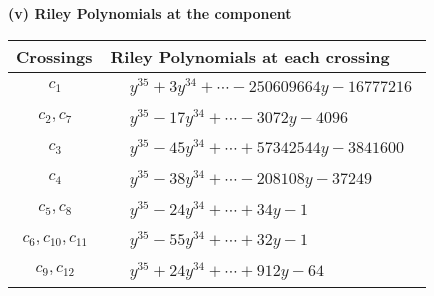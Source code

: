\documentclass[1p]{elsarticle_modified}
\theoremstyle{definition}
\begin{document}
\flushleft \textbf{(v) Riley Polynomials at the component}\newline \\
\begin{tabular}{m{50pt}|m{274pt}}
Crossings & \hspace{64pt}Riley Polynomials at each crossing \\
\hline $$\begin{aligned}c_{1}\end{aligned}$$&$\begin{aligned}
&y^{35}+3 y^{34}+\cdots-250609664 y-16777216
\end{aligned}$\\
\hline $$\begin{aligned}c_{2},c_{7}\end{aligned}$$&$\begin{aligned}
&y^{35}-17 y^{34}+\cdots-3072 y-4096
\end{aligned}$\\
\hline $$\begin{aligned}c_{3}\end{aligned}$$&$\begin{aligned}
&y^{35}-45 y^{34}+\cdots+57342544 y-3841600
\end{aligned}$\\
\hline $$\begin{aligned}c_{4}\end{aligned}$$&$\begin{aligned}
&y^{35}-38 y^{34}+\cdots-208108 y-37249
\end{aligned}$\\
\hline $$\begin{aligned}c_{5},c_{8}\end{aligned}$$&$\begin{aligned}
&y^{35}-24 y^{34}+\cdots+34 y-1
\end{aligned}$\\
\hline $$\begin{aligned}c_{6},c_{10},c_{11}\end{aligned}$$&$\begin{aligned}
&y^{35}-55 y^{34}+\cdots+32 y-1
\end{aligned}$\\
\hline $$\begin{aligned}c_{9},c_{12}\end{aligned}$$&$\begin{aligned}
&y^{35}+24 y^{34}+\cdots+912 y-64
\end{aligned}$\\
\hline
\end{tabular}\\~\\
\end{document}
